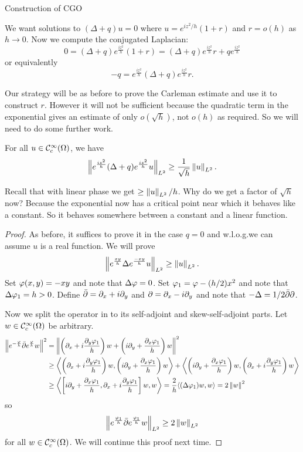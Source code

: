Construction of CGO

We want solutions to $(\Delta+q)u=0$ where $u=e^{iz^2/h}(1+r)$ and $r=o(h)$ as $h \to 0$.
Now we compute the conjugated Laplacian:
\[ 0=(\Delta+q)e^\frac{iz^2}{h}(1+r) = (\Delta+q)e^\frac{iz^2}{h}r+qe^\frac{iz^2}{h} \]
or equivalently
\[ -q = e^\frac{iz^2}h (\Delta+q) e^\frac{iz^2}h r. \]

Our strategy will be as before to prove the Carleman estimate and use it to construct $r$.
However it will not be sufficient because the quadratic term in the exponential gives an estimate of only $o(\sqrt{h})$, not $o(h)$ as required.
So we will need to do some further work.

\begin{prop}
  For all $u \in \mathcal{C}_c^\infty(\Omega)$, we have
  \[ \left\lVert  e^\frac{iz^2}h (\Delta+q) e^\frac{iz^2}h u \right\rVert_{L^2} \geq \frac{1}{\sqrt{h}} \left\lVert u \right\rVert_{L^2}. \]
\end{prop}

\begin{rmk}
  Recall that with linear phase we get $\geq \left\lVert u \right\rVert_{L^2}/h$.
  Why do we get a factor of $\sqrt{h}$ now?
  Because the exponential now has a critical point near which it behaves like a constant.
  So it behaves somewhere between a constant and a linear function.
\end{rmk}

\begin{proof}
  As before, it suffices to prove it in the case $q=0$ and w.l.o.g.\@ we can assume $u$ is a real function.
  We will prove
  \[ \left\lVert e^\frac{xy}h \Delta e^\frac{-xy}h u \right\rVert_{L^2} \geq \left\lVert u \right\rVert_{L^2}. \]
  Set $\varphi(x,y)=-xy$ and note that $\Delta\varphi=0$.
  Set $\varphi_1=\varphi-(h/2)x^2$ and note that $\Delta\varphi_1=h>0$.
  Define $\bar{\partial}=\partial_x+i\partial_y$ and $\partial=\partial_x-i\partial_y$ and note that $-\Delta=1/2\bar{\partial}\partial$.
  
  Now we split the operator in to its self-adjoint and skew-self-adjoint parts.
  Let $w \in \mathcal{C}_c^\infty(\Omega)$ be arbitrary.
  \begin{align*}
    \left\lVert e^{-\frac{\varphi} h} \bar{\partial} e^\frac {\varphi} h w \right\rVert^2 &= \left\lVert  \left( \partial_x + i\frac{\partial_y\varphi_1}h \right)w + \left( i\partial_y+\frac{\partial_x\varphi_1}h \right)w \right\rVert^2 \\
    &\geq {\left\langle \left( \partial_x + i\frac{\partial_y\varphi_1}h \right)w,\left( i\partial_y+\frac{\partial_x\varphi_1}h \right)w \right\rangle} + {\left\langle \left( i\partial_y+\frac{\partial_x\varphi_1}h \right)w,\left( \partial_x + i\frac{\partial_y\varphi_1}h \right)w \right\rangle} \\
    &\geq {\left\langle \left[ i\partial_y+\frac{\partial_x\varphi_1}h, \partial_x + i\frac{\partial_y\varphi_1}h \right]w,w \right\rangle} = \frac 2h {\left\langle (\Delta\varphi_1)w,w \right\rangle} = 2\left\lVert w \right\rVert^2
  \end{align*}
  so 
  \[ \left\lVert e^\frac{\varphi_1}h \bar{\partial} e^\frac{\varphi_1}h w \right\rVert_{L^2} \geq 2 \left\lVert w \right\rVert_{L^2} \]
  for all $w \in \mathcal{C}_c^\infty(\Omega)$.
  We will continue this proof next time.
\end{proof}

